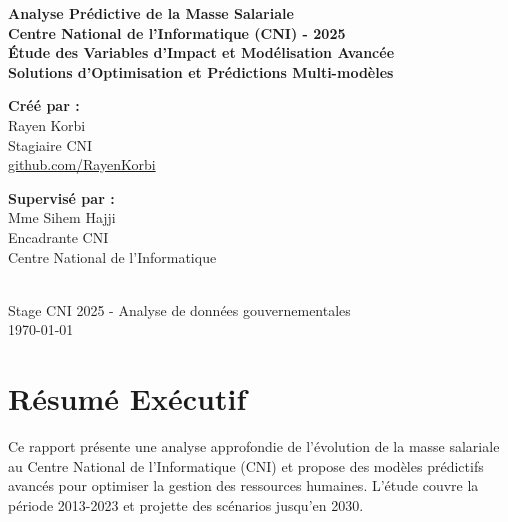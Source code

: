 \documentclass[12pt,a4paper]{article}
\begin{document}
\begin{titlepage}
    \centering
    \vspace*{2cm}
    
    {\Huge\textbf{Analyse Prédictive de la Masse Salariale}}\\[0.5cm]
    {\Large\textbf{Centre National de l'Informatique (CNI) - 2025}}\\[2cm]
    
    {\large\textbf{Étude des Variables d'Impact et Modélisation Avancée}}\\[1cm]
    {\large\textbf{Solutions d'Optimisation et Prédictions Multi-modèles}}\\[3cm]
    
    \begin{minipage}{0.4\textwidth}
        \begin{flushleft}
            \textbf{Créé par :}\\
            \large Rayen Korbi\\
            Stagiaire CNI\\
            \href{https://github.com/RayenKorbi}{github.com/RayenKorbi}
        \end{flushleft}
    \end{minipage}
    \begin{minipage}{0.4\textwidth}
        \begin{flushright}
            \textbf{Supervisé par :}\\
            \large Mme Sihem Hajji\\
            Encadrante CNI\\
            Centre National de l'Informatique
        \end{flushright}
    \end{minipage}\\[2cm]
    
    \vfill
    {\large Stage CNI 2025 - Analyse de données gouvernementales}\\
    {\large \today}
\end{titlepage}

\tableofcontents
\newpage

\section{Résumé Exécutif}

Ce rapport présente une analyse approfondie de l'évolution de la masse salariale au Centre National de l'Informatique (CNI) et propose des modèles prédictifs avancés pour optimiser la gestion des ressources humaines. L'étude couvre la période 2013-2023 et projette des scénarios jusqu'en 2030.
\end{document}
